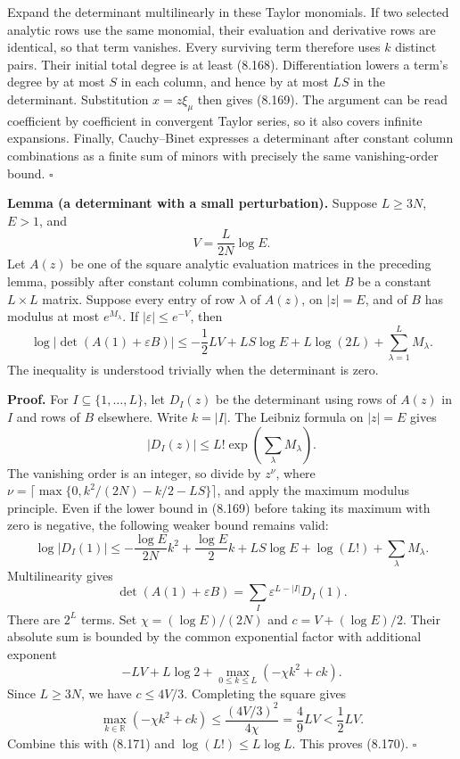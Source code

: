 \documentclass[
  11pt,
  a4paper,
]{article}
\begin{document}
Expand the determinant multilinearly in these Taylor monomials. If two
selected analytic rows use the same monomial, their evaluation and
derivative rows are identical, so that term vanishes. Every surviving
term therefore uses \(k\) distinct pairs. Their initial total degree is
at least (8.168). Differentiation lowers a term's degree by at most
\(S\) in each column, and hence by at most \(LS\) in the determinant.
Substitution \(x=z\xi_\mu\) then gives (8.169). The argument can be read
coefficient by coefficient in convergent Taylor series, so it also
covers infinite expansions. Finally, Cauchy--Binet expresses a
determinant after constant column combinations as a finite sum of minors
with precisely the same vanishing-order bound. \(\square\)

\textbf{Lemma (a determinant with a small perturbation).} Suppose
\(L\ge3N\), \(E>1\), and \[
V=\frac{L}{2N}\log E.
\] Let \(A(z)\) be one of the square analytic evaluation matrices in the
preceding lemma, possibly after constant column combinations, and let
\(B\) be a constant \(L\times L\) matrix. Suppose every entry of row
\(\lambda\) of \(A(z)\), on \(|z|=E\), and of \(B\) has modulus at most
\(e^{M_\lambda}\). If \(|\varepsilon|\le e^{-V}\), then \[
\log|\det(A(1)+\varepsilon B)|
\le-\frac12LV+LS\log E
+L\log(2L)+\sum_{\lambda=1}^L M_\lambda.
\tag{8.170}
\] The inequality is understood trivially when the determinant is zero.

\textbf{Proof.} For \(I\subseteq\{1,\ldots,L\}\), let \(D_I(z)\) be the
determinant using rows of \(A(z)\) in \(I\) and rows of \(B\) elsewhere.
Write \(k=|I|\). The Leibniz formula on \(|z|=E\) gives \[
|D_I(z)|\le L!\exp\left(\sum_\lambda M_\lambda\right).
\] The vanishing order is an integer, so divide by \(z^\nu\), where
\(\nu=\lceil\max\{0,k^2/(2N)-k/2-LS\}\rceil\), and apply the maximum
modulus principle. Even if the lower bound in (8.169) before taking its
maximum with zero is negative, the following weaker bound remains valid:
\[
\log|D_I(1)|
\le-\frac{\log E}{2N}k^2+\frac{\log E}{2}k
+LS\log E+\log(L!)+\sum_\lambda M_\lambda.
\tag{8.171}
\] Multilinearity gives \[
\det(A(1)+\varepsilon B)
=\sum_I\varepsilon^{L-|I|}D_I(1).
\] There are \(2^L\) terms. Set \(\chi=(\log E)/(2N)\) and
\(c=V+(\log E)/2\). Their absolute sum is bounded by the common
exponential factor with additional exponent \[
-LV+L\log2+\max_{0\le k\le L}(-\chi k^2+ck).
\] Since \(L\ge3N\), we have \(c\le4V/3\). Completing the square gives
\[
\max_{k\in\mathbb R}(-\chi k^2+ck)
\le\frac{(4V/3)^2}{4\chi}
=\frac49LV<\frac12LV.
\] Combine this with (8.171) and \(\log(L!)\le L\log L\). This proves
(8.170). \(\square\)
\end{document}
